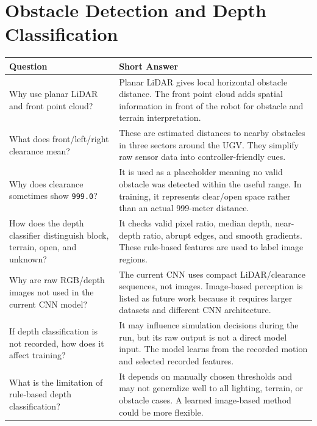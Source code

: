 \documentclass[11pt,a4paper]{article}
\begin{document}
\section*{Obstacle Detection and Depth Classification}
\begin{longtable}{QA}
\toprule
\textbf{Question} & \textbf{Short Answer} \\
\midrule
\endhead
Why use planar LiDAR and front point cloud? &
Planar LiDAR gives local horizontal obstacle distance. The front point cloud adds spatial information in front of the robot for obstacle and terrain interpretation. \\
\addlinespace
What does front/left/right clearance mean? &
These are estimated distances to nearby obstacles in three sectors around the UGV. They simplify raw sensor data into controller-friendly cues. \\
\addlinespace
Why does clearance sometimes show \texttt{999.0}? &
It is used as a placeholder meaning no valid obstacle was detected within the useful range. In training, it represents clear/open space rather than an actual 999-meter distance. \\
\addlinespace
How does the depth classifier distinguish block, terrain, open, and unknown? &
It checks valid pixel ratio, median depth, near-depth ratio, abrupt edges, and smooth gradients. These rule-based features are used to label image regions. \\
\addlinespace
Why are raw RGB/depth images not used in the current CNN model? &
The current CNN uses compact LiDAR/clearance sequences, not images. Image-based perception is listed as future work because it requires larger datasets and different CNN architecture. \\
\addlinespace
If depth classification is not recorded, how does it affect training? &
It may influence simulation decisions during the run, but its raw output is not a direct model input. The model learns from the recorded motion and selected recorded features. \\
\addlinespace
What is the limitation of rule-based depth classification? &
It depends on manually chosen thresholds and may not generalize well to all lighting, terrain, or obstacle cases. A learned image-based method could be more flexible. \\
\bottomrule
\end{longtable}
\end{document}
